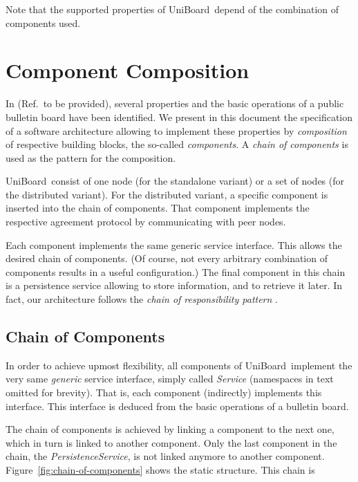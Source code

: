\documentclass[oneside]{scrreprt}
\newcommand{\uniboard}{\mbox{UniBoard}}
\newcommand{\fig}[1]{Figure~\ref{#1}}
\begin{document}
Note that the supported properties of \uniboard\ depend of the combination of components used.


\chapter{Component Composition}

In (Ref.\ to be provided), several properties and the basic operations of a public bulletin
board have been identified. We present in this document the
specification of a software architecture allowing to implement
these properties by \emph{composition} of respective building
blocks, the so-called \emph{components}. A
\emph{chain of components} is used as the pattern for the
composition.

\uniboard\ consist of one node (for the standalone variant) or
a set of nodes (for the distributed variant). For the
distributed variant, a specific component is inserted
into the chain of components. That component implements
the respective agreement protocol by communicating with
peer nodes.

Each component implements the same generic service interface.
This allows the desired chain of components. (Of
course, not every arbitrary combination of components results
in a useful configuration.) The final component in this chain
is a persistence service allowing to store information, and
to retrieve it later. In fact, our architecture follows the
\emph{chain of responsibility pattern} \cite{Gamma:1995:DPE:186897}.


\section{Chain of Components}

In order to achieve upmost flexibility, all components of
\uniboard\ implement the very same \emph{generic} service
interface, simply called \emph{Service} (namespaces in text
omitted for brevity). That is, each component (indirectly)
implements this interface. This interface is deduced from the 
basic operations of a bulletin board.

The chain of components is achieved by linking a component
to the next one, which in turn is linked to another component.
Only the last component in the chain, the \emph{PersistenceService}, is not
linked anymore to another component. \fig{fig:chain-of-components}
shows the static structure. This chain is 
\end{document}
